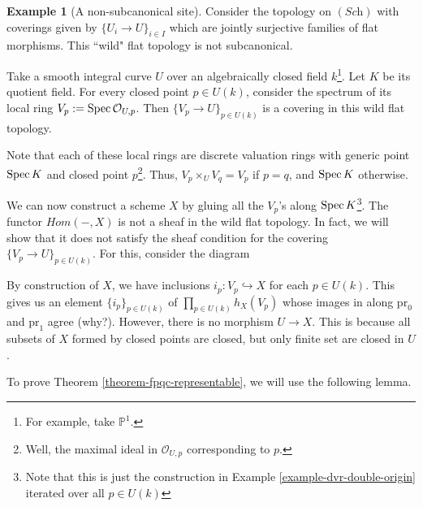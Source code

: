 \documentclass[11pt]{amsart}
\newcommand{\Spec}{{\rm Spec \,}}
\newcommand{\sO}{{\mathcal O}}
\renewcommand{\P}{{\mathbb P}}
\theoremstyle{definition}
\newtheorem{example}[theorem]{Example}
\begin{document}
\begin{example}[A non-subcanonical site]
	\label{example-non-subcanonical-site}
	Consider the topology on $(\textit{Sch})$ with coverings given by $\{U_i \to U\}_{i \in I}$ which are jointly surjective families of flat morphisms. This ``wild" flat topology is not subcanonical.
	
	Take a smooth integral curve $U$ over an algebraically closed field $k$\footnote{For example, take $\P^1$.}. Let $K$ be its quotient field. For every closed point $p\in U(k)$, consider the spectrum of its local ring $V_p:=\Spec \sO_{U,p}$. Then $\{V_p \to U\}_{p \in U(k)}$ is a covering in this wild flat topology.
	
	Note that each of these local rings are discrete valuation rings with generic point $\Spec K$ and closed point $p$\footnote{Well, the maximal ideal in $\sO_{U,p}$ corresponding to $p$.}. Thus, $V_p\times_U V_q =V_p$ if $p=q$, and $\Spec K$ otherwise.
	
	We can now construct a scheme $X$ by gluing all the $V_p$'s along $\Spec K$\footnote{Note that this is just the construction in Example \ref{example-dvr-double-origin} iterated over all $p\in U(k)$}. The functor $\mathit{Hom}(-,X)$ is not a sheaf in the wild flat topology. In fact, we will show that it does not satisfy the sheaf condition for the covering $\{V_p \to U\}_{p \in U(k)}$. For this, consider the diagram
	\begin{center}
	\end{center}
	By construction of $X$, we have inclusions $i_p:V_p\hookrightarrow X$ for each $p\in U(k)$. This gives us an element $\{i_p\}_{p\in U(k)}$ of $\prod_{p\in U(k)} h_X(V_p)$ whose images in along $\text{pr}_0$ and $\text{pr}_1$ agree (why?). However, there is no morphism $U\rightarrow X$. This is because all subsets of $X$ formed by closed points are closed, but only finite set are closed in $U$.
	
\end{example}


To prove Theorem \ref{theorem-fpqc-representable}, we will use the following lemma.
\end{document}
